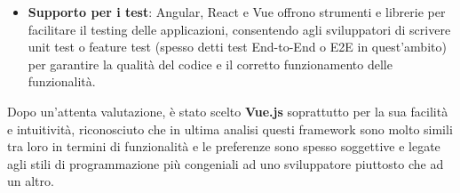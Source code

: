 \begin{itemize}
    \item \textbf{Supporto per i test}: Angular, React e Vue offrono strumenti e librerie per facilitare il testing delle applicazioni, consentendo agli sviluppatori di scrivere unit test o feature test (spesso detti test End-to-End o E2E in quest'ambito) per garantire la qualità del codice e il corretto funzionamento delle funzionalità.
\end{itemize}

Dopo un'attenta valutazione, è stato scelto \textbf{Vue.js} soprattutto per la sua facilità e intuitività, riconosciuto che in ultima analisi questi framework sono molto simili tra loro in termini di funzionalità e le preferenze sono spesso soggettive e legate agli stili di programmazione più congeniali ad uno sviluppatore piuttosto che ad un altro.

